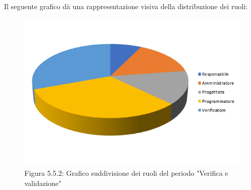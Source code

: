 Il seguente grafico dà una rappresentazione visiva della distribuzione dei ruoli: \\
\begin{figure} [H]
	\centering
	\includegraphics[scale=1]{Res/ExcelGrafici/Grafici/VerificaRuoli.png}
	\caption{Figura 5.5.2: Grafico suddivisione dei ruoli del periodo "Verifica e validazione"}\label{}
\end{figure}

\pagebreak

